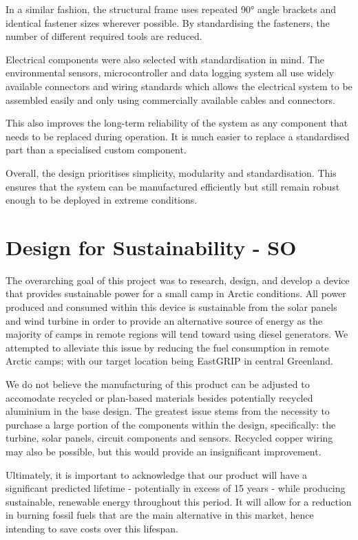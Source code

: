\documentclass[11pt,a4paper]{article}
\begin{document}
In a similar fashion, the structural frame uses repeated 90° angle brackets and identical fastener sizes wherever possible. By standardising the fasteners, the number of different required tools are reduced.

Electrical components were also selected with standardisation in mind. The environmental sensors, microcontroller and data logging system all use widely available connectors and wiring standards which allows the electrical system to be assembled easily and only using commercially available cables and connectors.

This also improves the long-term reliability of the system as any component that needs to be replaced during operation. It is much easier to replace a standardised part than a specialised custom component.

Overall, the design prioritises simplicity, modularity and standardisation. This ensures that the system can be manufactured efficiently but still remain robust enough to be deployed in extreme conditions.

\section{Design for Sustainability - SO}

The overarching goal of this project was to research, design, and develop a device that provides sustainable power for a small camp in Arctic conditions. All power produced and consumed within this device is sustainable from the solar panels and wind turbine in order to provide an alternative source of energy as the majority of camps in remote regions will tend toward using diesel generators. We attempted to alleviate this issue by reducing the fuel consumption in remote Arctic camps; with our target location being EastGRIP in central Greenland. 

We do not believe the manufacturing of this product can be adjusted to accomodate recycled or plan-based materials besides potentially recycled aluminium in the base design. The greatest issue stems from the necessity to purchase a large portion of the components within the design, specifically: the turbine, solar panels, circuit components and sensors. Recycled copper wiring may also be possible, but this would provide an insignificant improvement.

Ultimately, it is important to acknowledge that our product will have a significant predicted lifetime - potentially in excess of 15 years - while producing sustainable, renewable energy throughout this period. It will allow for a reduction in burning fossil fuels that are the main alternative in this market, hence intending to save costs over this lifespan.
\end{document}

